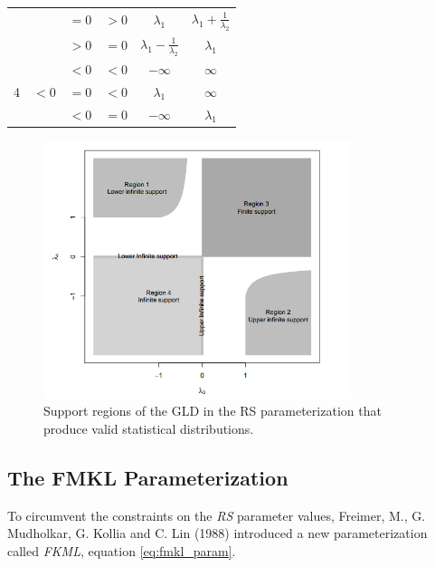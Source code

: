 \begin{table}[]
\begin{tabular}{c|c|c|c|c|c}
                   &                       & $=0$               & $>0$               & $\lambda_{1}$                                        & $\lambda_{1}+\frac{1}{\lambda_{2}}$                  \\
                   &                       & $>0$               & $=0$               & $\lambda_{1}-\frac{1}{\lambda_{2}}$                  & $\lambda_{1}$                                        \\ \hline
\multirow{3}{*}{4} & \multirow{3}{*}{$<0$} & $<0$               & $<0$               & $-\infty$                                            & $\infty$                                             \\
                   &                       & $=0$               & $<0$               & $\lambda_{1}$                                        & $\infty$                                             \\
                   &                       & $<0$               & $=0$               & $-\infty$                                            & $\lambda_{1}$                                        \\ \hline
\end{tabular}
\end{table}

\begin{figure}[H]
    \centering
    \includegraphics[width=0.8\textwidth]{img/gld/rs_regions.png}
    \caption{Support regions of the GLD in the RS parameterization that produce valid statistical
distributions.}
    \label{fig:rs_regions}
\end{figure}

\subsection{The FMKL Parameterization}\label{sub:fmkl_gld}
To circumvent the constraints on the \textit{RS} parameter values, Freimer, M., G. Mudholkar, G. Kollia and C. Lin (1988) introduced a new parameterization called \textit{FKML}, equation \ref{eq:fmkl_param}.

